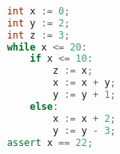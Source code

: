 \begin{lstlisting}[language=C++,basicstyle=\ttfamily,keywordstyle=\color{blue}]  % Start your code-block
	
	int x := 0;
	int y := 2;
	int z := 3;
	while x <= 20:
		if x <= 10:
			z := x;
			x := x + y;
			y := y + 1;
		else:
			x := x + 2;
			y := y - 3;
	assert x == 22;
	\end{lstlisting}